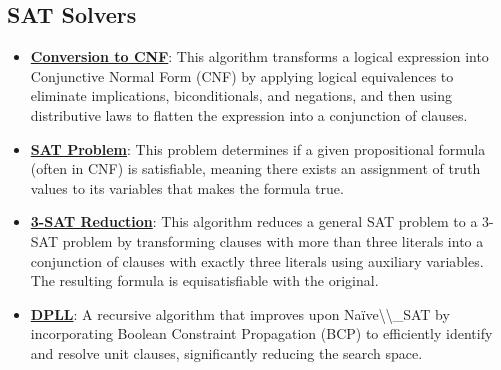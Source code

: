 \documentclass{article}%
\begin{document}
\subsection{SAT Solvers}%
\label{subsec:SATSolvers}%
\begin{itemize}[leftmargin=*]%
\item \href{https://purdue.brightspace.com/d2l/common/assets/pdfjs-d2l-dist/1.0.14-legacy/web/viewer.html?file=\%2Fcontent\%2Fenforced\%2F1095467-wl.202510.CS.24300.001\%2F13L1-Logic.pdf\%3Fou\%3D1095467\&lang=en-us\&container=d2l-fileviewer-rendered-pdf\&fullscreen=d2l-fileviewer-rendered-pdf-dialog\&height=667#page=17}{\textbf{Conversion to CNF}}: This algorithm transforms a logical expression into Conjunctive Normal Form (CNF) by applying logical equivalences to eliminate implications, biconditionals, and negations, and then using distributive laws to flatten the expression into a conjunction of clauses.%
\item \href{https://purdue.brightspace.com/d2l/common/assets/pdfjs-d2l-dist/1.0.14-legacy/web/viewer.html?file=\%2Fcontent\%2Fenforced\%2F1095467-wl.202510.CS.24300.001\%2F13L1-Logic.pdf\%3Fou\%3D1095467\&lang=en-us\&container=d2l-fileviewer-rendered-pdf\&fullscreen=d2l-fileviewer-rendered-pdf-dialog\&height=667#page=15}{\textbf{SAT Problem}}: This problem determines if a given propositional formula (often in CNF) is satisfiable, meaning there exists an assignment of truth values to its variables that makes the formula true.%
\item \href{https://purdue.brightspace.com/d2l/common/assets/pdfjs-d2l-dist/1.0.14-legacy/web/viewer.html?file=\%2Fcontent\%2Fenforced\%2F1095467-wl.202510.CS.24300.001\%2F13L1-Logic.pdf\%3Fou\%3D1095467\&lang=en-us\&container=d2l-fileviewer-rendered-pdf\&fullscreen=d2l-fileviewer-rendered-pdf-dialog\&height=667#page=24}{\textbf{3-SAT Reduction}}: This algorithm reduces a general SAT problem to a 3-SAT problem by transforming clauses with more than three literals into a conjunction of clauses with exactly three literals using auxiliary variables. The resulting formula is equisatisfiable with the original.%
\item \href{https://purdue.brightspace.com/d2l/common/assets/pdfjs-d2l-dist/1.0.14-legacy/web/viewer.html?file=\%2Fcontent\%2Fenforced\%2F1095467-wl.202510.CS.24300.001\%2F15L2-SAT.pdf\%3Fou\%3D1095467\&lang=en-us\&container=d2l-fileviewer-rendered-pdf\&fullscreen=d2l-fileviewer-rendered-pdf-dialog\&height=667#page=17}{\textbf{DPLL}}: A recursive algorithm that improves upon Naïve\textbackslash{}\textbackslash{}_SAT by incorporating Boolean Constraint Propagation (BCP) to efficiently identify and resolve unit clauses, significantly reducing the search space.%

\end{itemize}
\end{document}
